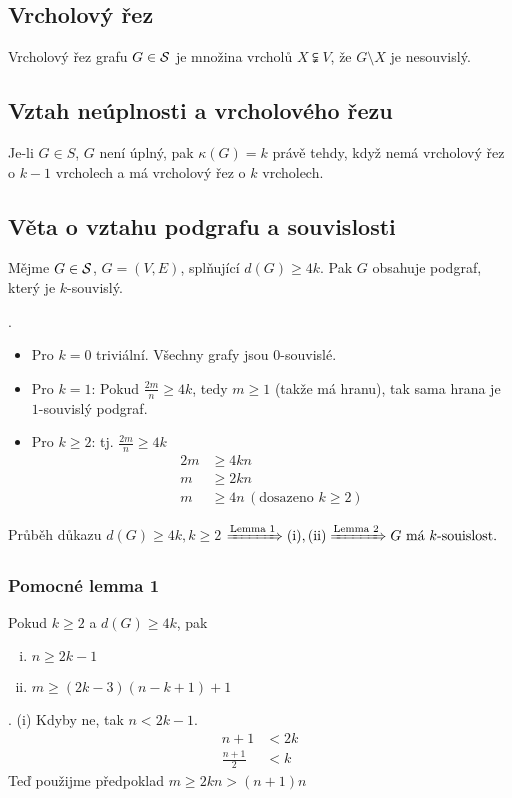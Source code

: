 \subsection{Vrcholový řez}\label{vrchRez}
Vrcholový řez grafu $G \in \S$ je množina vrcholů $X \subsetneqq V$, že $G \setminus X$ je nesouvislý.

\subsection{Vztah neúplnosti a vrcholového řezu}
Je-li $G \in S$, $G$ není úplný, pak $\kappa(G)=k$ právě tehdy, když nemá vrcholový řez o $k-1$ vrcholech a má vrcholový 
řez o $k$ vrcholech.

\subsection{Věta o vztahu podgrafu a souvislosti}
Mějme $G \in \S$, $G = (V,E)$, splňující $d(G) \geq 4k$. Pak $G$ obsahuje podgraf, který je $k$-souvislý.

. 
\begin{itemize}
    \item Pro $k=0$ triviální. Všechny grafy jsou $0$-souvislé.
    \item Pro $k=1$: Pokud $\frac{2m}{n} \geq 4k$, tedy $m \geq 1$ (takže má hranu), tak sama hrana je $1$-souvislý 
    podgraf.
    \item Pro $k \geq 2$: tj. $\frac{2m}{n} \geq 4k$
    \begin{align*}
        2m &\geq 4kn \\
        m &\geq 2kn \\
        m &\geq 4n \, (\text{dosazeno } k \geq 2)
    \end{align*}
\end{itemize}
Průběh důkazu $d(G) \geq 4k, k\geq 2$ $\xRightarrow{\text{Lemma 1}} (\text{i}), (\text{ii}) \xRightarrow{\text{Lemma 2}} 
G \text{ má } k \text{-souislost.}$
\subsubsection{Pomocné lemma 1}
Pokud $k \geq 2$ a $d(G) \geq 4k$, pak
\begin{enumerate}[(i), noitemsep]
    \item $n \geq 2k-1$
    \item $m \geq (2k-3)(n-k+1)+1$
\end{enumerate}
. (i) Kdyby ne, tak $n<2k-1$.
\begin{align*}
    n+1 &< 2k\\
    \frac{n+1}{2} &<k
\end{align*}
Teď použijme předpoklad $m \geq 2kn > (n+1)n$ %

